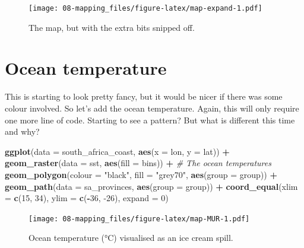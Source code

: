 \documentclass[
]{book}
\newenvironment{Shaded}{\begin{snugshade}}{\end{snugshade}}
\newcommand{\CommentTok}[1]{\textcolor[rgb]{0.56,0.35,0.01}{\textit{#1}}}
\newcommand{\DataTypeTok}[1]{\textcolor[rgb]{0.13,0.29,0.53}{#1}}
\newcommand{\DecValTok}[1]{\textcolor[rgb]{0.00,0.00,0.81}{#1}}
\newcommand{\KeywordTok}[1]{\textcolor[rgb]{0.13,0.29,0.53}{\textbf{#1}}}
\newcommand{\NormalTok}[1]{#1}
\newcommand{\OperatorTok}[1]{\textcolor[rgb]{0.81,0.36,0.00}{\textbf{#1}}}
\newcommand{\StringTok}[1]{\textcolor[rgb]{0.31,0.60,0.02}{#1}}
\begin{document}
\begin{figure}
\centering
\texttt{[image: 08-mapping\_files/figure-latex/map-expand-1.pdf]}
\caption{\label{fig:map-expand}The map, but with the extra bits snipped off.}
\end{figure}

\hypertarget{ocean-temperature}{%
\section{Ocean temperature}\label{ocean-temperature}}

This is starting to look pretty fancy, but it would be nicer if there was some colour involved. So let's add the ocean temperature. Again, this will only require one more line of code. Starting to see a pattern? But what is different this time and why?

\begin{Shaded}
\begin{Highlighting}[]
\KeywordTok{ggplot}\NormalTok{(}\DataTypeTok{data =}\NormalTok{ south\_africa\_coast, }\KeywordTok{aes}\NormalTok{(}\DataTypeTok{x =}\NormalTok{ lon, }\DataTypeTok{y =}\NormalTok{ lat)) }\OperatorTok{+}
\StringTok{  }\KeywordTok{geom\_raster}\NormalTok{(}\DataTypeTok{data =}\NormalTok{ sst, }\KeywordTok{aes}\NormalTok{(}\DataTypeTok{fill =}\NormalTok{ bins)) }\OperatorTok{+}\StringTok{ }\CommentTok{\# The ocean temperatures}
\StringTok{  }\KeywordTok{geom\_polygon}\NormalTok{(}\DataTypeTok{colour =} \StringTok{"black"}\NormalTok{, }\DataTypeTok{fill =} \StringTok{"grey70"}\NormalTok{, }\KeywordTok{aes}\NormalTok{(}\DataTypeTok{group =}\NormalTok{ group)) }\OperatorTok{+}
\StringTok{  }\KeywordTok{geom\_path}\NormalTok{(}\DataTypeTok{data =}\NormalTok{ sa\_provinces, }\KeywordTok{aes}\NormalTok{(}\DataTypeTok{group =}\NormalTok{ group)) }\OperatorTok{+}
\StringTok{  }\KeywordTok{coord\_equal}\NormalTok{(}\DataTypeTok{xlim =} \KeywordTok{c}\NormalTok{(}\DecValTok{15}\NormalTok{, }\DecValTok{34}\NormalTok{), }\DataTypeTok{ylim =} \KeywordTok{c}\NormalTok{(}\OperatorTok{{-}}\DecValTok{36}\NormalTok{, }\DecValTok{{-}26}\NormalTok{), }\DataTypeTok{expand =} \DecValTok{0}\NormalTok{)}
\end{Highlighting}
\end{Shaded}

\begin{figure}
\centering
\texttt{[image: 08-mapping\_files/figure-latex/map-MUR-1.pdf]}
\caption{\label{fig:map-MUR}Ocean temperature (°C) visualised as an ice cream spill.}
\end{figure}
\end{document}
